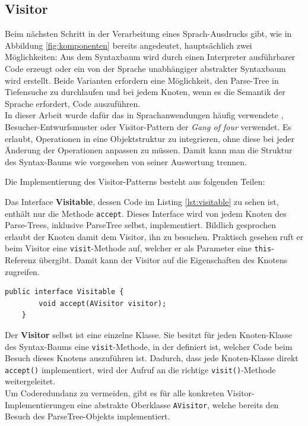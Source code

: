 \subsection{Visitor}\label{ssct:4.3.5:visitor}
Beim nächsten Schritt in der Verarbeitung eines Sprach-Ausdrucks gibt, wie in Abbildung \ref{fig:komponenten} bereits angedeutet, hauptsächlich zwei Möglichkeiten: Aus dem Syntaxbaum wird durch einen Interpreter ausführbarer Code erzeugt oder ein von der Sprache unabhängiger abstrakter Syntaxbaum wird erstellt. Beide Varianten erfordern eine Möglichkeit, den Parse-Tree in Tiefensuche zu durchlaufen und bei jedem Knoten, wenn es die Semantik der Sprache erfordert, Code auszuführen.\\
In dieser Arbeit wurde dafür das in Sprachanwendungen häufig verwendete \cite{book:parrLang}, \cite{www:wiki:visitor} Besucher-Entwurfsmuster oder Visitor-Pattern der \emph{Gang of four} \cite{book:designPatterns} verwendet. Es erlaubt, Operationen in eine Objektstruktur zu integrieren, ohne diese bei jeder Änderung der Operationen anpassen zu müssen. Damit kann man die Struktur des Syntax-Baums wie vorgesehen von seiner Auswertung trennen.

Die Implementierung des Visitor-Patterns besteht aus folgenden Teilen:

Das Interface \textbf{Visitable}, dessen Code im Listing \ref{lst:visitable} zu sehen ist, enthält nur die Methode \texttt{accept}. Dieses Interface wird von jedem Knoten des Parse-Trees, inklusive ParseTree selbst, implementiert.  Bildlich gesprochen erlaubt der Knoten damit dem Visitor, ihn zu besuchen. Praktisch gesehen ruft er beim Visitor eine \texttt{visit}-Methode auf, welcher er als Parameter eine \texttt{this}-Referenz übergibt. Damit kann der Visitor auf die Eigenschaften des Knotens zugreifen.\\

\begin{lstlisting}[caption={Code des Visitable-Interfaces},label=lst:visitable]
	public interface Visitable {
		void accept(AVisitor visitor);
	}
\end{lstlisting}

Der \textbf{Visitor} selbst ist eine einzelne Klasse. Sie besitzt für jeden Knoten-Klasse des Syntax-Baums eine \texttt{visit}-Methode, in der definiert ist, welcher Code beim Besuch dieses Knotens auszuführen ist. Dadurch, dass jede Knoten-Klasse direkt \texttt{accept()} implementiert, wird der Aufruf an die richtige \texttt{visit()}-Methode weitergeleitet.\\
Um Coderedundanz zu vermeiden, gibt es für alle konkreten Visitor-Implementierungen eine abstrakte Oberklasse \texttt{AVisitor}, welche bereits den Besuch des ParseTree-Objekts implementiert.\\


